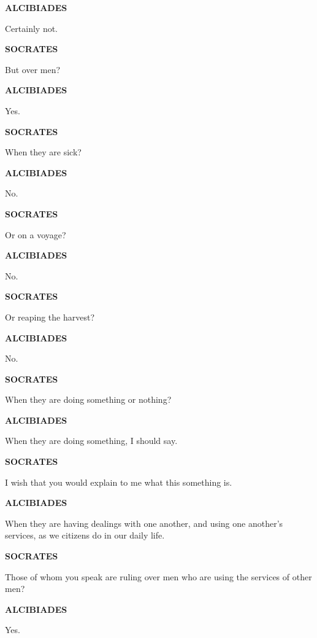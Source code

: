 \documentclass[11pt,letter]{article}
\begin{document}
\par \textbf{ALCIBIADES}
\par   Certainly not.

\par \textbf{SOCRATES}
\par   But over men?

\par \textbf{ALCIBIADES}
\par   Yes.

\par \textbf{SOCRATES}
\par   When they are sick?

\par \textbf{ALCIBIADES}
\par   No.

\par \textbf{SOCRATES}
\par   Or on a voyage?

\par \textbf{ALCIBIADES}
\par   No.

\par \textbf{SOCRATES}
\par   Or reaping the harvest?

\par \textbf{ALCIBIADES}
\par   No.

\par \textbf{SOCRATES}
\par   When they are doing something or nothing?

\par \textbf{ALCIBIADES}
\par   When they are doing something, I should say.

\par \textbf{SOCRATES}
\par   I wish that you would explain to me what this something is.

\par \textbf{ALCIBIADES}
\par   When they are having dealings with one another, and using one another's services, as we citizens do in our daily life.

\par \textbf{SOCRATES}
\par   Those of whom you speak are ruling over men who are using the services of other men?

\par \textbf{ALCIBIADES}
\par   Yes.
\end{document}
